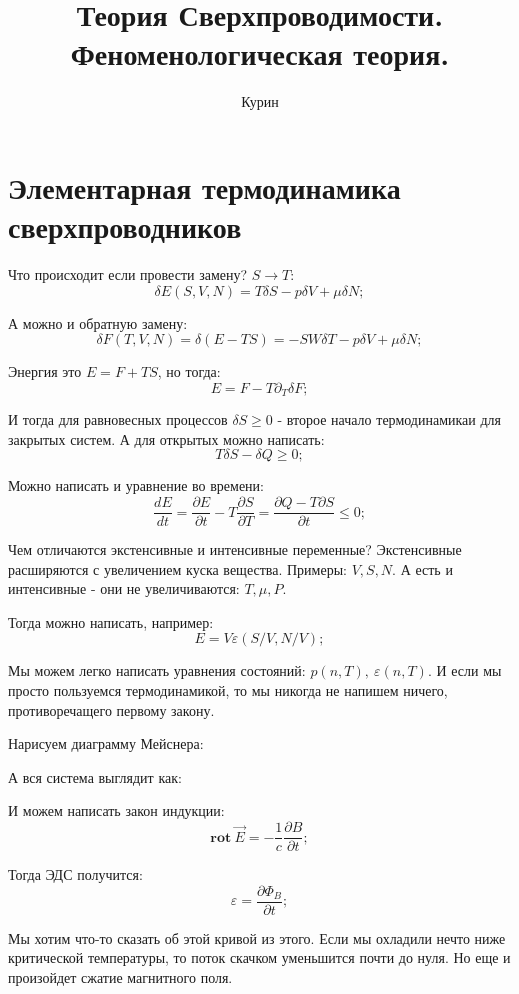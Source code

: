 \documentclass[a4paper, 14pt, russian]{article}
\title{Теория Сверхпроводимости. Феноменологическая теория.}
\author{Курин}
\date{}
\newcommand{\be}{\begin{equation}}
\newcommand{\ee}{\end{equation}}
\newcommand{\pa}{\partial}
\newcommand{\rot}{\textbf{rot}~}
\begin{document}
	\maketitle

	\section{Элементарная термодинамика сверхпроводников}

	Что происходит если провести замену? $S \rightarrow T$:
	\be
		\delta E (S, V, N)= T \delta S - p \delta V + \mu \delta N;
	\ee

	А можно и обратную замену:
	\be
		\delta F(T, V, N) = \delta (E - TS) = - SW \delta T - p \delta V + \mu \delta N; 
	\ee

	Энергия это $E = F + TS$, но тогда:
	\be
		E = F - T \pa_T \delta F; 
	\ee

	И тогда для равновесных процессов $\delta S \ge 0$ - второе начало термодинамикаи для
	закрытых систем. А для открытых можно написать:
	\be
		T \delta S - \delta Q \ge 0;
	\ee

	Можно написать и уравнение во времени:
	\be
		\frac{d E}{dt} = \frac{\pa E}{\pa t} - T \frac{\pa S}{\pa T} = \frac{\pa Q - T \pa S}{\pa t} \le 0;
	\ee

	Чем отличаются экстенсивные и интенсивные переменные? Экстенсивные расширяются с увеличением
	куска вещества. Примеры: $V, S, N$. А есть и интенсивные - они не увеличиваются:
	$T, \mu, P$.

	Тогда можно написать, например:
	\be
		E = V \varepsilon(S / V, N / V);
	\ee

	Мы можем легко написать уравнения состояний: $p(n,T),~\varepsilon(n,T)$. 
	И если мы просто пользуемся термодинамикой, то мы никогда не напишем ничего,
	противоречащего первому закону.

	Нарисуем диаграмму Мейснера:


	А вся система выглядит как:


	И можем написать закон индукции:
	\be
		\rot \vec E = - \frac{1}{c} \frac{\pa B}{\pa t};
	\ee

	Тогда ЭДС получится:
	\be
		\varepsilon = \frac{\pa \Phi_{B}}{\pa t};
	\ee

	Мы хотим что-то сказать об этой кривой из этого. 
	Если мы охладили нечто ниже критической температуры, то 
	поток скачком уменьшится почти до нуля. Но еще и 
	произойдет сжатие магнитного поля. 
\end{document}

